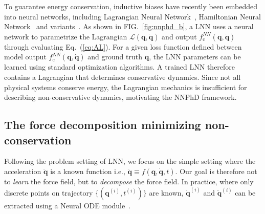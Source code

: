 \documentclass[aps,pre,reprint,superscriptaddress,nofootinbib,amsmath,amssymb]{revtex4-2}
\newcommand{\mat}[1]{\mathbf{#1}}
\newcommand{\q}{\mat{q}}
\newcommand{\qd}{\dot{\mat{q}}}
\newcommand{\qdd}{\ddot{\mat{q}}}
\newcommand{\lag}{\mathcal{L}}
\begin{document}
To guarantee energy conservation, inductive biases have recently been embedded into neural networks, including Lagrangian Neural Network~\cite{cranmer2020lagrangian}, Hamiltonian Neural Network~\cite{greydanus2019hamiltonian} and variants~\cite{finzi2020simplifying, choudhary2020forecasting,jin2020sympnets, HGN}.
As shown in FIG.~\ref{fig:nnphd_b}, a LNN uses a neural network to parametrize the Lagrangian $\lag(\q,\qd)$ and output $f_{\mathrm{c}}^{NN}(\q,\qd)$ through evaluating Eq.~(\ref{eq:AL}). For a given loss function defined between model output $f_{\mathrm{c}}^{NN}(\q,\qd)$ and ground truth $\qdd$, the LNN parameters can be learned  using standard  optimization algorithms. A trained LNN therefore contains a Lagrangian that determines conservative dynamics. Since not all physical systems conserve energy, the  Lagrangian mechanics is insufficient for describing non-conservative dynamics, motivating the NNPhD framework.

\subsection{The force decomposition minimizing non-conservation}\label{sec:problem_formulation}

Following the problem setting of LNN, we focus on the simple setting where the acceleration $\qdd$ is a known function i.e.,  $\qdd\equiv f(\q,\qd,t)$. Our goal is therefore not to {\it learn} the force field, but to {\it decompose} the force field. In practice, where only discrete points on trajectory $\{(\q^{(i)},t^{(i)})\}$ are known, $\qd^{(i)}$ and $\qdd^{(i)}$ can be extracted using a Neural ODE module~\cite{chen2018neural}.
\end{document}
